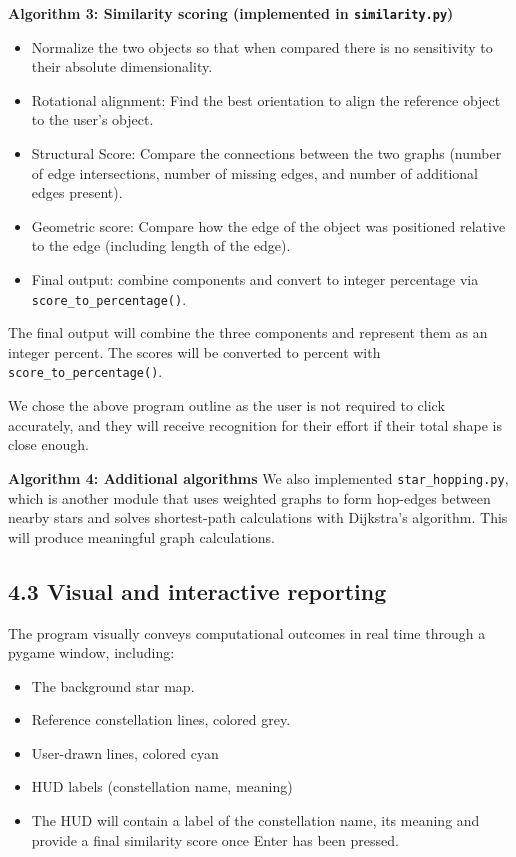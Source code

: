 \documentclass[11pt]{article}
\begin{document}
\textbf{Algorithm 3: Similarity scoring (implemented in \texttt{similarity.py})}
\begin{itemize}
    \item Normalize the two objects so that when compared there is no sensitivity to their absolute dimensionality.
    \item Rotational alignment: Find the best orientation to align the reference object to the user's object.
    \item Structural Score: Compare the connections between the two graphs (number of edge intersections, number of missing edges, and number of additional edges present).
    \item Geometric score: Compare how the edge of the object was positioned relative to the edge (including length of the edge).
    \item Final output: combine components and convert to integer percentage via \texttt{score\_to\_percentage()}.
\end{itemize}

The final output will combine the three components and represent them as an integer percent. The scores will be converted to percent with \texttt{score\_to\_percentage()}. 

We chose the above program outline as the user is not required to click accurately, and they will receive recognition for their effort if their total shape is close enough.

\textbf{Algorithm 4: Additional algorithms}
We also implemented \texttt{star\_hopping.py}, which is another module that uses weighted graphs to form hop-edges between nearby stars and solves shortest-path calculations with Dijkstra's algorithm. This will produce meaningful graph calculations.

\subsection*{4.3 Visual and interactive reporting}

The program visually conveys computational outcomes in real time through a pygame window, including:

\begin{itemize}
    \item The background star map.
    \item Reference constellation lines, colored grey.
    \item User-drawn lines, colored cyan
    \item HUD labels (constellation name, meaning)
    \item The HUD will contain a label of the constellation name, its meaning and provide a final similarity score once Enter has been pressed.
\end{itemize}
\end{document}
